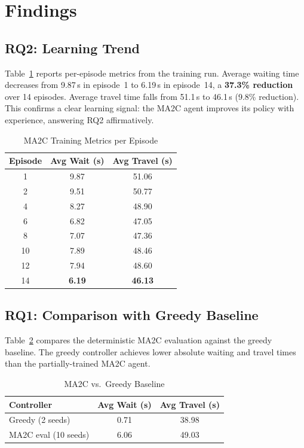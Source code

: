 \documentclass[conference]{IEEEtran}
\begin{document}
\section{Findings}

\subsection{RQ2: Learning Trend}

Table~\ref{tab:training} reports per-episode metrics from the training run.
Average waiting time decreases from 9.87\,s in episode~1 to 6.19\,s in
episode~14, a \textbf{37.3\% reduction} over 14 episodes. Average travel time
falls from 51.1\,s to 46.1\,s (9.8\% reduction). This confirms a clear learning
signal: the MA2C agent improves its policy with experience, answering RQ2
affirmatively.

\begin{table}[h]
\caption{MA2C Training Metrics per Episode}
\label{tab:training}
\centering
\renewcommand{\arraystretch}{1.2}
\begin{tabular}{ccc}
\toprule
\textbf{Episode} & \textbf{Avg Wait (s)} & \textbf{Avg Travel (s)} \\
\midrule
1  & 9.87 & 51.06 \\
2  & 9.51 & 50.77 \\
4  & 8.27 & 48.90 \\
6  & 6.82 & 47.05 \\
8  & 7.07 & 47.36 \\
10 & 7.89 & 48.46 \\
12 & 7.94 & 48.60 \\
14 & \textbf{6.19} & \textbf{46.13} \\
\bottomrule
\end{tabular}
\end{table}

\subsection{RQ1: Comparison with Greedy Baseline}

Table~\ref{tab:comparison} compares the deterministic MA2C evaluation against
the greedy baseline. The greedy controller achieves lower absolute waiting and
travel times than the partially-trained MA2C agent.

\begin{table}[h]
\caption{MA2C vs.\ Greedy Baseline}
\label{tab:comparison}
\centering
\renewcommand{\arraystretch}{1.2}
\begin{tabular}{lcc}
\toprule
\textbf{Controller} & \textbf{Avg Wait (s)} & \textbf{Avg Travel (s)} \\
\midrule
Greedy (2 seeds)     & 0.71  & 38.98 \\
MA2C eval (10 seeds) & 6.06  & 49.03 \\
\bottomrule
\end{tabular}
\end{table}
\end{document}
